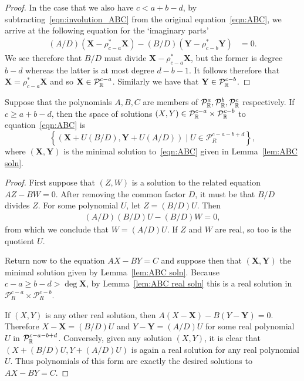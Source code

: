 \documentclass{article}
\begin{document}
\begin{lem}
\begin{proof}
In the case that we also have $c<a+b-d$, by subtracting~\eqref{eqn:involution_ABC} from the original equation~\eqref{eqn:ABC}, we arrive at the following equation for the `imaginary parts'
\begin{align*}
(A/D)\left(\mathbf{X} - \rho_{c-a}^*\mathbf{X} \right)
-(B/D)\left(\mathbf{Y} - \rho_{c-b}^*\mathbf{Y} \right)
&= 0.
\end{align*}
We see therefore that $B/D$ must divide $\mathbf{X} - \rho_{c-a}^*\mathbf{X}$, but the former is degree $b-d$ whereas the latter is at most degree $d-b-1$. It follows therefore that $\mathbf{X}=\rho_{c-a}^*\mathbf{X}$ and so $\mathbf{X} \in \mathcal{P}_{\mathbb{R}}^{c-a}$. Similarly we have that $\mathbf{Y} \in \mathcal{P}_{\mathbb{R}}^{c-b}$.
\end{proof}
\end{lem}

\begin{lem}\label{lem:ABC soln space}
Suppose that the polynomials $A,B,C$ are members of $\mathcal{P}^a_{\mathbb{R}}, \mathcal{P}^b_{\mathbb{R}}, \mathcal{P}^c_{\mathbb{R}}$ respectively. If $c \geq a+b-d$, then the space of solutions $(X,Y) \in \mathcal{P}^{c-a}_{\mathbb{R}} \times \mathcal{P}^{c-b}_{\mathbb{R}}$ to equation~\eqref{eqn:ABC} is
\[
\left\{(\mathbf{X} + U(B/D), \mathbf{Y} + U(A/D)) \mid U \in \mathcal{P}_R^{c-a-b+d} \right\},
\]
where $(\mathbf{X},\mathbf{Y})$ is the minimal solution to~\eqref{eqn:ABC} given in Lemma~\ref{lem:ABC soln}.

\begin{proof}
First suppose that $(Z,W)$ is a solution to the related equation $AZ-BW = 0$. After removing the common factor $D$, it must be that $B/D$ divides $Z$. For some polynomial $U$, let $Z = (B/D)U$. Then
\begin{align*}
(A/D)(B/D)U - (B/D) W = 0,
\end{align*}
from which we conclude that $W = (A/D)U$. If $Z$ and $W$ are real, so too is the quotient $U$.

Return now to the equation $AX-BY=C$ and suppose then that $(\mathbf{X},\mathbf{Y})$ the minimal solution given by Lemma~\ref{lem:ABC soln}.
Because $c-a \geq b-d > \deg \mathbf{X}$, by Lemma~\ref{lem:ABC real soln} this is a real solution in $\mathcal{P}^{c-a}_R \times \mathcal{P}^{c-b}_R$.

If $(X,Y)$ is any other real solution, then $A(X-\mathbf{X}) - B(Y-\mathbf{Y}) = 0$. Therefore $X - \mathbf{X} = (B/D)U$ and $Y - \mathbf{Y} = (A/D)U$ for some real polynomial $U$ in $\mathcal{P}_{\mathbb{R}}^{c-a-b+d}$. Conversely, given any solution $(X,Y)$, it is clear that $(X+(B/D)U,Y+(A/D)U)$ is again a real solution for any real polynomial $U$.
Thus polynomials of this form are exactly the desired solutions to $AX-BY=C$.
\end{proof}
\end{lem}
\end{document}
